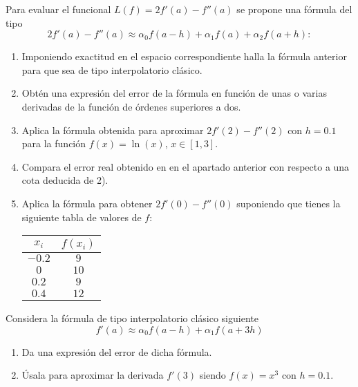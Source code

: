 \begin{ejercicio}\label{ej:2.2.2}
    Para evaluar el funcional $L(f) = 2f'(a) - f''(a)$ se propone una fórmula del tipo
    \[
    2f'(a) - f''(a) \approx \alpha_0 f(a - h) + \alpha_1 f(a) + \alpha_2 f(a + h) :
    \]
    \begin{enumerate}
        \item Imponiendo exactitud en el espacio correspondiente halla la fórmula anterior para que sea de tipo interpolatorio clásico.
        
        \item Obtén una expresión del error de la fórmula en función de unas o varias derivadas de la función de órdenes superiores a dos.
        
        \item Aplica la fórmula obtenida para aproximar $2f'(2) - f''(2)$ con $h = 0.1$ para la función $f(x) = \ln(x)$, $x \in [1, 3]$.
        
        \item Compara el error real obtenido en en el apartado anterior con respecto a una cota deducida de 2).
        
        \item Aplica la fórmula para obtener $2f'(0) - f''(0)$ suponiendo que tienes la siguiente tabla de valores de $f$:
        \begin{center}
            \begin{tabular}{c|c}
                $x_i$ & $f(x_i)$ \\
                \hline
                $-0.2$ & $9$ \\
                $0$ & $10$ \\
                $0.2$ & $9$ \\
                $0.4$ & $12$
            \end{tabular}
        \end{center}
    \end{enumerate}
\end{ejercicio}

\begin{ejercicio}\label{ej:2.2.3}
    Considera la fórmula de tipo interpolatorio clásico siguiente
    \[
    f'(a) \approx \alpha_0 f(a - h) + \alpha_1 f(a + 3h)
    \]
    \begin{enumerate}
        \item Da una expresión del error de dicha fórmula.
        
        \item Úsala para aproximar la derivada $f'(3)$ siendo $f(x) = x^3$ con $h = 0.1$.
    \end{enumerate}
\end{ejercicio}

